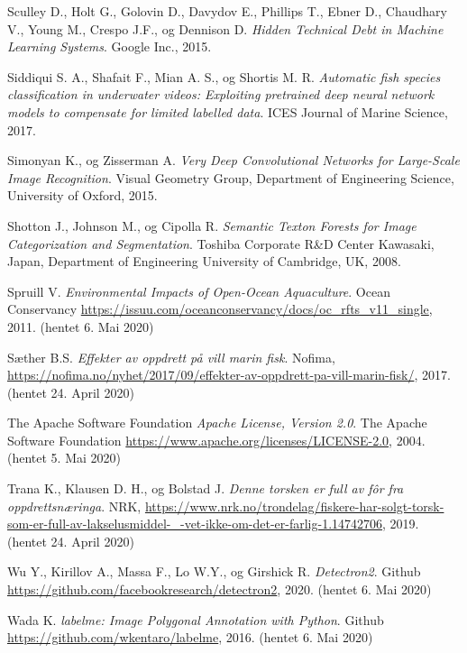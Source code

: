 \documentclass[11ot]{article}
\begin{document}
\begin{thebibliography}{9}
Sculley D., Holt G., Golovin D., Davydov E., Phillips T., Ebner D., Chaudhary V., Young M., Crespo J.F., og Dennison D. 
\textit{Hidden Technical Debt in Machine Learning Systems}. 
Google Inc., 2015.

Siddiqui S. A., Shafait F., Mian A. S., og Shortis M. R. 
\textit{Automatic fish species classification in underwater videos: Exploiting pretrained deep neural network models to compensate for limited labelled data}. 
ICES Journal of Marine Science, 2017.

Simonyan K., og Zisserman A. 
\textit{Very Deep Convolutional Networks for Large-Scale Image Recognition}. 
Visual Geometry Group, Department of Engineering Science, University of Oxford, 2015.

Shotton J., Johnson M., og Cipolla R. 
\textit{Semantic Texton Forests for Image Categorization and Segmentation}. 
Toshiba Corporate R\&D Center Kawasaki, Japan, Department of Engineering University of Cambridge, UK, 2008.

Spruill V.
\textit{Environmental Impacts of Open-Ocean Aquaculture}. 
Ocean Conservancy \url{https://issuu.com/oceanconservancy/docs/oc_rfts_v11_single}, 2011. (hentet 6. Mai 2020)

Sæther B.S. 
\textit{Effekter av oppdrett på vill marin fisk}. 
Nofima, \url{https://nofima.no/nyhet/2017/09/effekter-av-oppdrett-pa-vill-marin-fisk/}, 2017. (hentet 24. April 2020)

The Apache Software Foundation 
\textit{Apache License, Version 2.0}. 
The Apache Software Foundation \url{https://www.apache.org/licenses/LICENSE-2.0}, 2004. (hentet 5. Mai 2020)

Trana K., Klausen D. H., og Bolstad J. 
\textit{Denne torsken er full av fôr fra oppdrettsnæringa}. 
NRK, \url{https://www.nrk.no/trondelag/fiskere-har-solgt-torsk-som-er-full-av-lakselusmiddel-_-vet-ikke-om-det-er-farlig-1.14742706}, 2019. (hentet 24. April 2020)

Wu Y., Kirillov A., Massa F., Lo W.Y., og Girshick R.
\textit{Detectron2}. 
Github \url{https://github.com/facebookresearch/detectron2}, 2020. (hentet 6. Mai 2020)

Wada K.
\textit{labelme: Image Polygonal Annotation with Python}. 
Github \url{https://github.com/wkentaro/labelme}, 2016. (hentet 6. Mai 2020)


\end{thebibliography}
\end{document}

